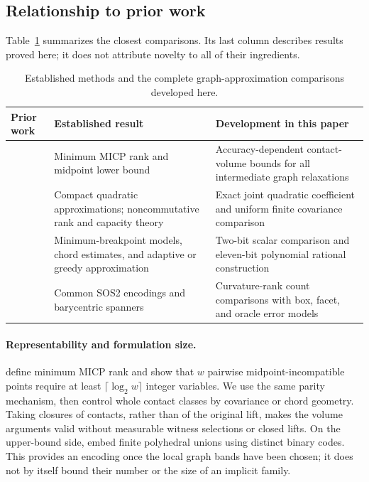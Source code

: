 \subsection{Relationship to prior work}

Table~\ref{tab:result-map} summarizes the closest comparisons. Its last
column describes results proved here; it does not attribute novelty to
all of their ingredients.
\begin{table}[htbp]
\centering\small
\begin{tabular}{@{}>{\raggedright\arraybackslash}p{}>{\raggedright\arraybackslash}p{}>{\raggedright\arraybackslash}p{}@{}}
\toprule
Prior work & Established result & Development in this paper\\
\midrule
\citet{lubin2022} & Minimum MICP rank and midpoint lower bound & Accuracy-dependent contact-volume bounds for all intermediate graph relaxations\\
\citet{beach2022,ggow2020,iqs2018} & Compact quadratic approximations; noncommutative rank and capacity theory & Exact joint quadratic coefficient and uniform finite covariance comparison\\
\citet{rebennack2015,simchowitz2018,codsi2025} & Minimum-breakpoint models, chord estimates, and adaptive or greedy approximation & Two-bit scalar comparison and eleven-bit polynomial rational construction\\
\citet{lyu2026,awerbuch2004} & Common SOS2 encodings and barycentric spanners & Curvature-rank count comparisons with box, facet, and oracle error models\\
\bottomrule
\end{tabular}
\caption{Established methods and the complete graph-approximation comparisons developed here.}
\label{tab:result-map}
\end{table}

\paragraph{Representability and formulation size.}
\citet[Definition 4.3 and Lemma 4.1]{lubin2022} define minimum MICP rank
and show that $w$ pairwise midpoint-incompatible points require at least
$\lceil\log_2w\rceil$ integer variables. We use the same parity mechanism,
then control whole contact classes by covariance or chord geometry.
Taking closures of contacts, rather than of the original lift, makes the
volume arguments valid without measurable witness selections or closed
lifts. On the upper-bound side, \citet[Proposition 1]{vielma2018} embed
finite polyhedral unions using distinct binary codes. This provides an
encoding once the local graph bands have been chosen; it does not by
itself bound their number or the size of an implicit family.

